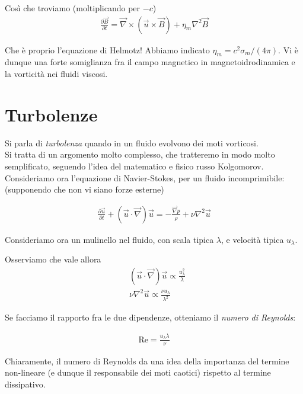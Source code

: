\documentclass{report}
\begin{document}
Così che troviamo (moltiplicando per \(-c\))
\begin{align}
    \frac{\partial \vec{B}}{\partial t} = \vec{\nabla}\times (\vec{u}\times \vec{B}) + \eta_m \nabla^2\vec{B}
\end{align}

Che è proprio l'equazione di Helmotz! Abbiamo indicato \(\eta_m = c^2\sigma_m/(4\pi)\). Vi è dunque una forte somiglianza fra il campo magnetico in magnetoidrodinamica e la vorticità nei fluidi viscosi. 

\section{Turbolenze}

Si parla di \emph{turbolenza} quando in un fluido evolvono dei moti vorticosi. \\
Si tratta di un argomento molto complesso, che tratteremo in modo molto semplificato, seguendo l'idea del matematico e fisico russo Kolgomorov. \\

Consideriamo ora l'equazione di Navier-Stokes, per un fluido incomprimibile: (supponendo che non vi siano forze esterne)

\begin{align}
    \frac{\partial \vec{u}}{\partial t} + (\vec{u}\cdot \vec{\nabla})\vec{u} = -\frac{\vec{\nabla}p}{\rho} + \nu \nabla^2\vec{u}
\end{align}

Consideriamo ora un mulinello nel fluido, con scala tipica \(\lambda\), e velocità tipica \(u_{\lambda}\). 

Osserviamo che vale allora 
\begin{align}
    &(\vec{u}\cdot \vec{\nabla})\vec{u}\propto \frac{u_{\lambda}^2}{\lambda} \\
    & \nu \nabla^2 \vec{u} \propto \frac{\nu u_\lambda}{\lambda^2}
\end{align}

Se facciamo il rapporto fra le due dipendenze, otteniamo il \emph{numero di Reynolds}: 

\begin{align}
    \text{Re} = \frac{u_{\lambda} \lambda}{\nu}
\end{align}

Chiaramente, il numero di Reynolds da una idea della importanza del termine non-lineare (e dunque il responsabile dei moti caotici) rispetto al termine dissipativo. \\
\end{document}
